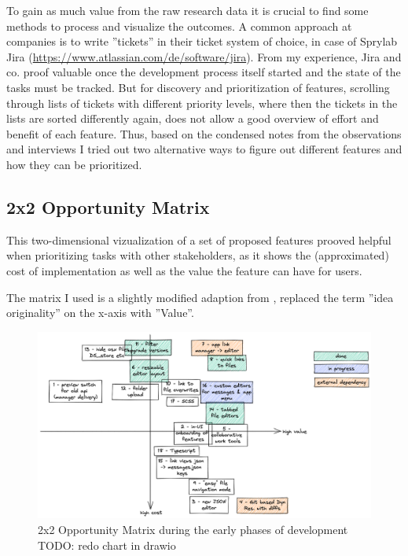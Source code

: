 To gain as much value from the raw research data it is crucial to find some methods to process and visualize the outcomes.
A common approach at companies is to write ''tickets'' in their ticket system of choice, in case of Sprylab Jira (\url{https://www.atlassian.com/de/software/jira}).
From my experience, Jira and co. proof valuable once the development process itself started and the state of the tasks must be tracked.
But for discovery and prioritization of features, scrolling through lists of tickets with different priority levels, where then the tickets in the lists are sorted differently again, does not allow a good overview of effort and benefit of each feature.
Thus, based on the condensed notes from the observations and interviews I tried out two alternative ways to figure out different features and how they can be prioritized.

\subsection{2x2 Opportunity Matrix}

This two-dimensional vizualization of a set of proposed features prooved helpful when prioritizing tasks with other stakeholders,
as it shows the (approximated) cost of implementation as well as the value the feature can have for users.

The matrix I used is a slightly modified adaption from \cite[p. 181]{LearnHCI:2020ys}, replaced the term ''idea originality'' on the x-axis with ''Value''.

\begin{figure}[h!]
	\centering
  \includegraphics[width=\textwidth]{pics/feature_cost_matrix.excalidraw.png}
	\caption{2x2 Opportunity Matrix during the early phases of development TODO: redo chart in drawio}
	\label{fig:opportunitymatrix}
\end{figure}


